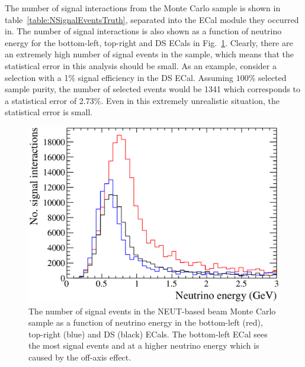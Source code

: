 The number of signal interactions from the Monte Carlo sample is shown in table~\ref{table:NSignalEventsTruth}, separated into the ECal module they occurred in.  The number of signal interactions is also shown as a function of neutrino energy for the bottom-left, top-right and DS ECals in Fig.~\ref{fig:NSignalEventsTruthNeutrinoEnergy}.  Clearly, there are an extremely high number of signal events in the sample, which means that the statistical error in this analysis should be small.  As an example, consider a selection with a 1$\%$ signal efficiency in the DS ECal.  Assuming $100\%$ selected sample purity, the number of selected events would be 1341 which corresponds to a statistical error of 2.73$\%$.  Even in this extremely unrealistic situation, the statistical error is small.
\begin{figure}
  \centering
  \includegraphics[width=12cm]{images/selection/signal_definition/NSignalEventsNeutrinoEnergy.eps}
  \caption{The number of signal events in the NEUT-based beam Monte Carlo sample as a function of neutrino energy in the bottom-left (red), top-right (blue) and DS (black) ECals.  The bottom-left ECal sees the most signal events and at a higher neutrino energy which is caused by the off-axis effect.}
  \label{fig:NSignalEventsTruthNeutrinoEnergy}
\end{figure}
